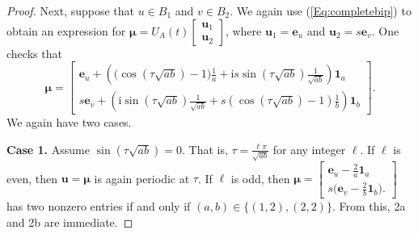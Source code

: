 \documentclass[10pt,a4paper]{amsart}
\newcommand{\be}{\mathbf e}
\newcommand{\bmu}{{\boldsymbol{\mu}}}
\newcommand{\bu}{\mathbf u}
\def\ii{\mathrm{i}}
\newcommand{\uno}{\mathbf 1}
\begin{document}
\begin{proof}
Next, suppose that $u\in B_1$ and $v\in B_2$. We again use (\ref{Eq:completebip}) to obtain an expression for $\bmu=U_A(t)\begin{bmatrix}
\bu_1\\ \bu_2\end{bmatrix}$, where $\bu_1=\be_u$ and $\bu_2=s\be_v$. One checks that
\begin{equation}
\label{Eq:pf}
\bmu=\begin{bmatrix}
\be_u+\left(\big(\cos( \tau\sqrt{ab})-1\big)\frac{1}{a}+\ii s\sin(\tau\sqrt{ab})\frac{1}{\sqrt{ab}}\right)\uno_a \\ s\be_v+\left(\ii\sin(\tau\sqrt{ab})\frac{1}{\sqrt{ab}}+s(\cos(\tau\sqrt{ab})-1)\frac{1}{b}\right)\uno_b
\end{bmatrix}. 
\end{equation}
We again have two cases.

\noindent \textbf{Case 1.} Assume $\sin( \tau\sqrt{ab})=0$. That is, $\tau=\frac{\ell\pi}{\sqrt{ab}}$ for any integer $\ell$. If $\ell$ is even, then $\bu=\bmu$ is again periodic at $\tau$. If $\ell$ is odd, then 
$\bmu=\begin{bmatrix}
\be_u-\frac{2}{a}\uno_a \\ s\big(\be_v-\frac{2}{b}\uno_b\big).
\end{bmatrix}$ has two nonzero entries if and only if $(a,b)\in\{(1,2),(2,2)\}$. From this, 2a and 2b are immediate. 


\end{proof}
\end{document}
